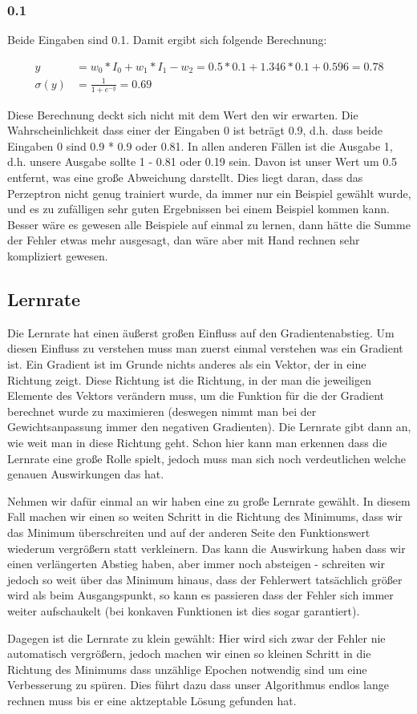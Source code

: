 \documentclass[a4paper]{article}
\begin{document}
\subsubsection{0.1}
Beide Eingaben sind 0.1. Damit ergibt sich folgende Berechnung:

\begin{align*}
	y &= w_0 * I_0 + w_1 * I_1 - w_2 = 0.5 * 0.1 + 1.346 * 0.1 + 0.596 = 0.78 \\
	\sigma(y) &= \frac{1}{1 + e^{-y}} = 0.69
\end{align*}

Diese Berechnung deckt sich nicht mit dem Wert den wir erwarten. Die Wahrscheinlichkeit dass einer der Eingaben 0 ist beträgt 0.9, d.h. dass beide Eingaben 0 sind 0.9 * 0.9 oder 0.81. In allen anderen Fällen ist die Ausgabe 1, d.h. unsere Ausgabe sollte 1 - 0.81 oder 0.19 sein. Davon ist unser Wert um 0.5 entfernt, was eine große Abweichung darstellt. Dies liegt daran, dass das Perzeptron nicht genug trainiert wurde, da immer nur ein Beispiel gewählt wurde, und es zu zufälligen sehr guten Ergebnissen bei einem Beispiel kommen kann. Besser wäre es gewesen alle Beispiele auf einmal zu lernen, dann hätte die Summe der Fehler etwas mehr ausgesagt, dan wäre aber mit Hand rechnen sehr kompliziert gewesen.

\subsection{Lernrate}
Die Lernrate hat einen äußerst großen Einfluss auf den Gradientenabstieg. Um diesen Einfluss zu verstehen muss man zuerst einmal verstehen was ein Gradient ist. Ein Gradient ist im Grunde nichts anderes als ein Vektor, der in eine Richtung zeigt. Diese Richtung ist die Richtung, in der man die jeweiligen Elemente des Vektors verändern muss, um die Funktion für die der Gradient berechnet wurde zu maximieren (deswegen nimmt man bei der Gewichtsanpassung immer den negativen Gradienten). Die Lernrate gibt dann an, wie weit man in diese Richtung geht. Schon hier kann man erkennen dass die Lernrate eine große Rolle spielt, jedoch muss man sich noch verdeutlichen welche genauen Auswirkungen das hat.

Nehmen wir dafür einmal an wir haben eine zu große Lernrate gewählt. In diesem Fall machen wir einen so weiten Schritt in die Richtung des Minimums, dass wir das Minimum überschreiten und auf der anderen Seite den Funktionswert wiederum vergrößern statt verkleinern. Das kann die Auswirkung haben dass wir einen verlängerten Abstieg haben, aber immer noch absteigen - schreiten wir jedoch so weit über das Minimum hinaus, dass der Fehlerwert tatsächlich größer wird als beim Ausgangspunkt, so kann es passieren dass der Fehler sich immer weiter aufschaukelt (bei konkaven Funktionen ist dies sogar garantiert).

Dagegen ist die Lernrate zu klein gewählt: Hier wird sich zwar der Fehler nie automatisch vergrößern, jedoch machen wir einen so kleinen Schritt in die Richtung des Minimums dass unzählige Epochen notwendig sind um eine Verbesserung zu spüren. Dies führt dazu dass unser Algorithmus endlos lange rechnen muss bis er eine aktzeptable Lösung gefunden hat.
\end{document}
